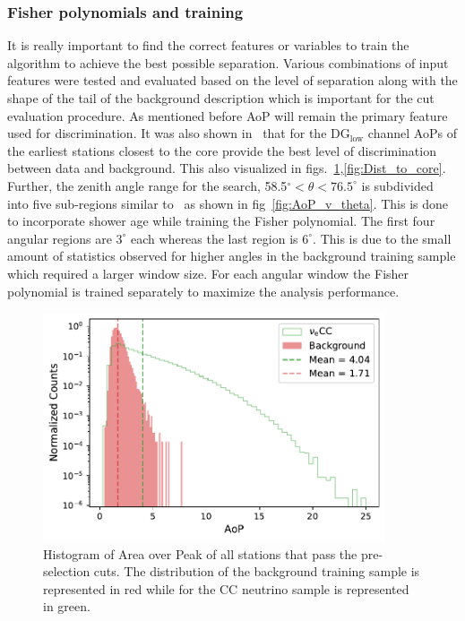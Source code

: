 \subsubsection{Fisher polynomials and training}
\label{subsubsec:nu_sel_fisher_training}
It is really important to find the correct features or variables to train the algorithm to achieve the best possible separation. Various combinations of input features were tested and evaluated based on the level of separation along with the shape of the tail of the background description which is important for the cut evaluation procedure. As mentioned before AoP will remain the primary feature used for discrimination. It was also shown in~\cite{gap_note_2013} that for the DG$\mathrm{_{low}}$ channel AoPs of the earliest stations closest to the core provide the best level of discrimination between data and background. This also visualized in figs.~\ref{fig:Time_to_core},\ref{fig:Dist_to_core}. Further, the zenith angle range for the search, 58.5$^\circ < \theta < 76.5^\circ$ is subdivided into five sub-regions similar to~\cite{gap_note_2013} as shown in fig~\ref{fig:AoP_v_theta}. This is done to incorporate shower age while training the Fisher polynomial. The first four angular regions are $3^\circ$ each whereas the last region is $6^\circ$. This is due to the small amount of statistics observed for higher angles in the background training sample which required a larger window size. For each angular window the Fisher polynomial is trained separately to maximize the analysis performance. 

\begin{figure}[h!]
  \centering
  \includegraphics[width=0.9\textwidth]{thesis_figures/Nu_analysis/Selection_Evo_AoP_hist_wnt_redcut.pdf}
  \caption{Histogram of Area over Peak of all stations that pass the pre-selection cuts. The distribution of the background training sample is represented in red while for the CC neutrino sample is represented in green.}
  \label{fig:Time_to_core}
\end{figure}

